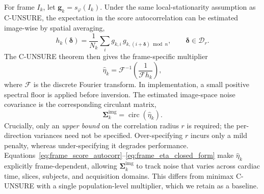 \documentclass[10pt,twocolumn]{article}
\begin{document}
For frame $I_k$, let $\bm{g}_k=s_{\varphi}(I_k)$. Under the same local-stationarity assumption as C-UNSURE, the expectation in the score autocorrelation can be estimated image-wise by spatial averaging,
\begin{equation}
    h_k(\bm{\delta})
    =\frac{1}{N_k}\sum_i
    g_{k,i}\,g_{k,(i+\bm{\delta})\bmod n},
    \qquad \bm{\delta}\in\mathcal{D}_r.
    \label{eq:frame_score_autocorr}
\end{equation}
The C-UNSURE theorem then gives the frame-specific multiplier
\begin{equation}
    \hat{\eta}_k
    =\mathcal{F}^{-1}\!\left(\frac{1}{\mathcal{F}h_k}\right),
    \label{eq:frame_eta_closed_form}
\end{equation}
where $\mathcal{F}$ is the discrete Fourier transform. In implementation, a small positive spectral floor is applied before inversion. The estimated image-space noise covariance is the corresponding circulant matrix,
\begin{equation}
    \bm{\Sigma}_k^{\text{img}} = \operatorname{circ}(\hat{\eta}_k).
    \label{eq:img_cov}
\end{equation}
Crucially, only an \emph{upper bound} on the correlation radius $r$ is required; the per-direction variances need not be specified. Over-specifying $r$ incurs only a mild penalty, whereas under-specifying it degrades performance. Equations~\eqref{eq:frame_score_autocorr}--\eqref{eq:frame_eta_closed_form} make $\hat{\eta}_k$ explicitly frame-dependent, allowing $\bm{\Sigma}_k^{\text{img}}$ to track noise that varies across cardiac time, slices, subjects, and acquisition domains. This differs from minimax C-UNSURE with a single population-level multiplier, which we retain as a baseline.
\end{document}
